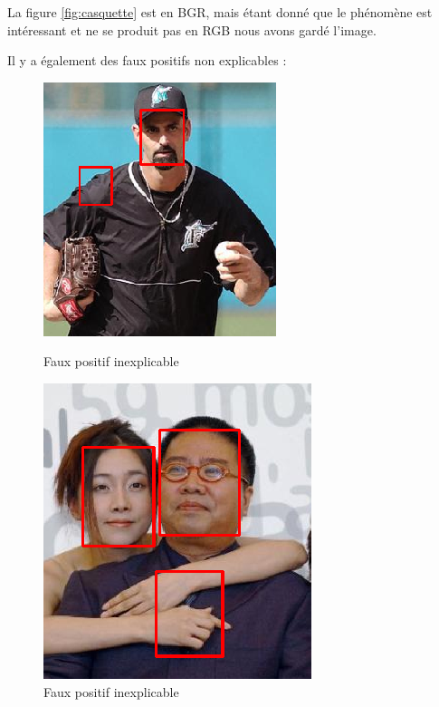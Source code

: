 \documentclass[a4paper,11pt]{article}
\begin{document}
La figure \ref{fig:casquette} est en BGR, mais étant donné que le phénomène est intéressant et ne se produit pas en RGB nous avons gardé l'image.

Il y a également des faux positifs non explicables :\\

\begin{figure}[H]
    \centering
    \begin{minipage}[c]{0.50\linewidth}
        \begin{center}
            \includegraphics[scale=0.52]{facenetFP4.png}
            \caption{Faux positif inexplicable}
        \end{center}
    \end{minipage} \hfill
    \begin{minipage}[c]{0.45\linewidth}
        \begin{center}
            \includegraphics[scale=0.45]{facenetFP5.png}
            \caption{Faux positif inexplicable}
        \end{center}
    \end{minipage}
\end{figure}
\end{document}
